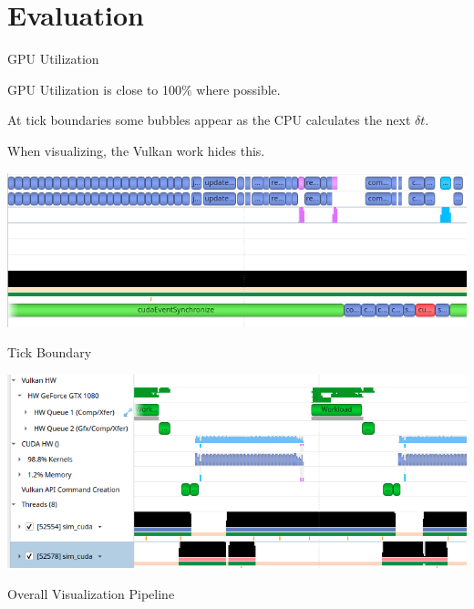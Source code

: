 \section{Evaluation}

\begin{frame}{GPU Utilization}
    
    \begin{wideitemize}
        \item GPU Utilization is close to 100\% where possible.
    
        \item At tick boundaries some bubbles appear as the CPU calculates the next $\delta{t}$.
    
        \item When visualizing, the Vulkan work hides this.
    \end{wideitemize}

    \vfill\null
    \begin{minipage}{0.49\textwidth}
        \includegraphics[width=\textwidth]{Presentation/images/sim_tick_edge.png}
        \begin{center}
            Tick Boundary
        \end{center}
    \end{minipage}\hfill%
    \begin{minipage}{0.49\textwidth}
        \includegraphics[width=\textwidth]{Presentation/images/final_pipeline_implementation.png}
        \begin{center}
            {Overall Visualization Pipeline}
        \end{center}
    \end{minipage}%
    
\end{frame}

